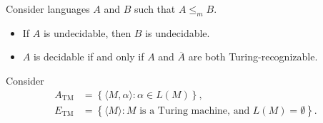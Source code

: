 \begin{thm}
    Consider languages $A$ and $B$ such that $A \leq_m B$.
    \begin{itemize}
        \item If $A$ is undecidable, then $B$ is undecidable.
        \item $A$ is decidable if and only if $A$ and $\overline{A}$ are both Turing-recognizable.
    \end{itemize}
\end{thm}

\begin{exmp}
    Consider
    \begin{align*}
        A_{\textrm{TM}} &= \left\{\langle M, \alpha \rangle : \alpha \in L(M)\right\}, \\
        E_{\textrm{TM}} &= \left\{\langle M \rangle : M \textrm{ is a Turing machine, and } L(M) = \emptyset\right\}.
    \end{align*}
\end{exmp}
